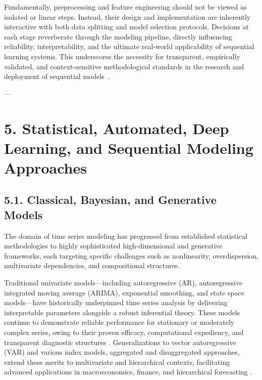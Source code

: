 \documentclass[11pt]{article}
\begin{document}
Fundamentally, preprocessing and feature engineering should not be viewed as isolated or linear steps. Instead, their design and implementation are inherently interactive with both data splitting and model selection protocols. Decisions at each stage reverberate through the modeling pipeline, directly influencing reliability, interpretability, and the ultimate real-world applicability of sequential learning systems. This underscores the necessity for transparent, empirically validated, and context-sensitive methodological standards in the research and deployment of sequential models~\cite{ref5, ref14, ref30, ref83, ref85, ref87}.

---

\section{5. Statistical, Automated, Deep Learning, and Sequential Modeling Approaches}

\subsection{5.1. Classical, Bayesian, and Generative Models}

The domain of time series modeling has progressed from established statistical methodologies to highly sophisticated high-dimensional and generative frameworks, each targeting specific challenges such as nonlinearity, overdispersion, multivariate dependencies, and compositional structures.

Traditional univariate models—including autoregressive (AR), autoregressive integrated moving average (ARIMA), exponential smoothing, and state space models—have historically underpinned time series analysis by delivering interpretable parameters alongside a robust inferential theory. These models continue to demonstrate reliable performance for stationary or moderately complex series, owing to their proven efficacy, computational expediency, and transparent diagnostic structures \cite{ref1,ref3,ref4,ref5,ref6,ref7,ref8,ref10,ref12,ref13,ref19,ref21,ref22,ref23,ref26,ref29,ref61,ref62,ref63,ref64,ref65,ref66,ref86}. Generalizations to vector autoregressive (VAR) and various index models, aggregated and disaggregated approaches, extend these merits to multivariate and hierarchical contexts, facilitating advanced applications in macroeconomics, finance, and hierarchical forecasting \cite{ref13,ref19,ref22,ref23,ref26,ref29,ref61}.
\end{document}

